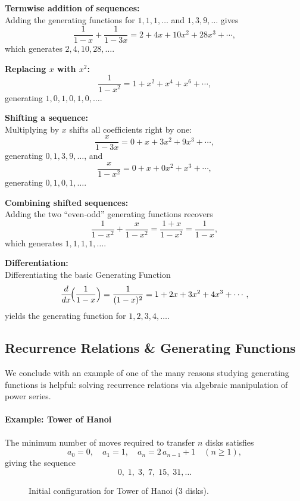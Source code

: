 \documentclass{article}
\begin{document}
\medskip
\noindent
\textbf{Termwise addition of sequences:}\\
Adding the generating functions for \(1,1,1,\dots\) and \(1,3,9,\dots\) gives
\[
\frac{1}{1-x} + \frac{1}{1-3x}
= 2 + 4x + 10x^2 + 28x^3 + \cdots,
\]
which generates \(2,4,10,28,\dots\).

\medskip
\noindent
\textbf{Replacing \(x\) with \(x^2\):}
\[
\frac{1}{1-x^2} = 1 + x^2 + x^4 + x^6 + \cdots,
\]
generating \(1,0,1,0,1,0,\dots\).

\medskip
\noindent
\textbf{Shifting a sequence:}\\
Multiplying by \(x\) shifts all coefficients right by one:
\[
\frac{x}{1-3x} = 0 + x + 3x^2 + 9x^3 + \cdots,
\]
generating \(0,1,3,9,\dots\), and
\[
\frac{x}{1-x^2} = 0 + x + 0x^2 + x^3 + \cdots,
\]
generating \(0,1,0,1,\dots\).

\medskip
\noindent
\textbf{Combining shifted sequences:}\\
Adding the two “even‑odd” generating functions recovers
\[
\frac{1}{1-x^2} + \frac{x}{1-x^2} = \frac{1+x}{1-x^2} = \frac{1}{1-x},
\]
which generates \(1,1,1,1,\dots\).

\medskip
\noindent
\textbf{Differentiation:}\\
Differentiating the basic Generating Function
\[
\frac{d}{dx}\!\Bigl(\frac{1}{1-x}\Bigr)
= \frac{1}{(1-x)^2}
= 1 + 2x + 3x^2 + 4x^3 + \cdots,
\]
yields the generating function for \(1,2,3,4,\dots\).


\medskip

\FloatBarrier            %

\subsection{Recurrence Relations \& Generating Functions}

We conclude with an example of one of the many reasons studying generating functions is helpful: solving recurrence relations via algebraic manipulation of power series.

\paragraph{Example: Tower of Hanoi}  
The minimum number of moves required to transfer \(n\) disks satisfies
\[
a_0 = 0,\quad
a_1 = 1,\quad
a_n = 2\,a_{n-1} + 1 \quad(n\ge1),
\]
giving the sequence
\[
0,\;1,\;3,\;7,\;15,\;31,\dots
\]

\begin{figure}[ht]
  \centering
  \caption{Initial configuration for Tower of Hanoi (3 disks).}
\end{figure}
\end{document}
